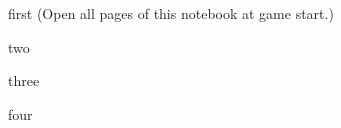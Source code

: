 \documentclass[notebook]{Silversiders} %
\begin{document}
\startnotebook{\nSurvival{}}

\begin{page}{first}
(Open all pages of this notebook at game start.)


\end{page}

\begin{page}{two}

\end{page}

\begin{page}{three}

\end{page}

\begin{page}{four}

\end{page}

\endnotebook
\end{document}
